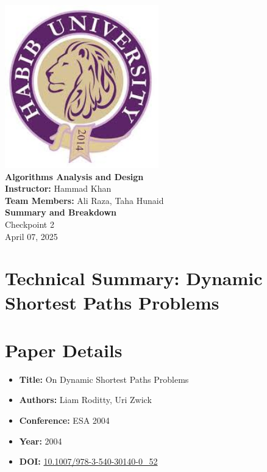\documentclass{report}
\begin{document}
\begin{titlepage}
    \centering
    \vspace*{2cm}
    \includegraphics[width=0.5\textwidth]{untitiled.jpeg} \\
    \large
    \textbf{Algorithms Analysis and Design} \\[1cm]
    \normalsize
    \textbf{Instructor:} Hammad Khan \\[0.5cm]
    \textbf{Team Members:} Ali Raza, Taha Hunaid \\[1cm]
    \normalsize
    \textbf{Summary and Breakdown} \\[0.5cm]
    \normalsize
    Checkpoint 2 \\[0.8cm]
    \normalsize
    April 07, 2025
    \vfill
\end{titlepage}

\newpage
{}

\section*{Technical Summary: Dynamic Shortest Paths Problems}

\section*{Paper Details}
\begin{itemize}
    \item \textbf{Title:} On Dynamic Shortest Paths Problems
    \item \textbf{Authors:} Liam Roditty, Uri Zwick
    \item \textbf{Conference:} ESA 2004
    \item \textbf{Year:} 2004
    \item \textbf{DOI:} \href{https://doi.org/10.1007/978-3-540-30140-0_52}{10.1007/978-3-540-30140-0_52}
\end{itemize}
\end{document}
